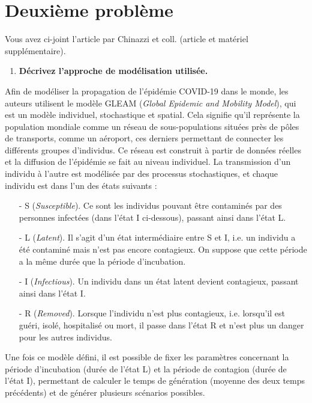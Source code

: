\documentclass[12pt, a4paper]{article}
\begin{document}
\pagebreak
\section{Deuxième problème}

Vous avez ci-joint l’article \cite{chinazzi19} par Chinazzi et coll. (article et matériel supplémentaire).

\begin{enumerate}
\item \textbf{Décrivez l’approche de modélisation utilisée.}
\end{enumerate}

Afin de modéliser la propagation de l'épidémie COVID-19 dans le monde, les auteurs utilisent le modèle GLEAM (\textit{Global Epidemic and Mobility Model}), qui est un modèle individuel, stochastique et spatial. Cela signifie qu'il représente la population mondiale comme un réseau de sous-populations situées près de pôles de transports, comme un aéroport, ces derniers permettant de connecter les différents groupes d'individus. Ce réseau est construit à partir de données réelles et la diffusion de l'épidémie se fait au niveau individuel. La transmission d'un individu à l'autre est modélisée par des processus stochastiques, et chaque individu est dans l'un des états suivants :
\begin{itemize}
    \item[-] S (\textit{Susceptible}). Ce sont les individus pouvant être contaminés par des personnes infectées (dans l'état I ci-dessous), passant ainsi dans l'état L.
    \item[-] L (\textit{Latent}). Il s'agit d'un état intermédiaire entre S et I, i.e. un individu a été contaminé mais n'est pas encore contagieux. On suppose que cette période a la même durée que la période d'incubation.
    \item[-] I (\textit{Infectious}). Un individu dans un état latent devient contagieux, passant ainsi dans l'état I.
    \item[-] R (\textit{Removed}). Lorsque l'individu n'est plus contagieux, i.e. lorsqu'il est guéri, isolé, hospitalisé ou mort, il passe dans l'état R et n'est plus un danger pour les autres individus.
\end{itemize}

Une fois ce modèle défini, il est possible de fixer les paramètres concernant la période d'incubation (durée de l'état L) et la période de contagion (durée de l'état I), permettant de calculer le temps de génération (moyenne des deux temps précédents) et de générer plusieurs scénarios possibles.
\end{document}
